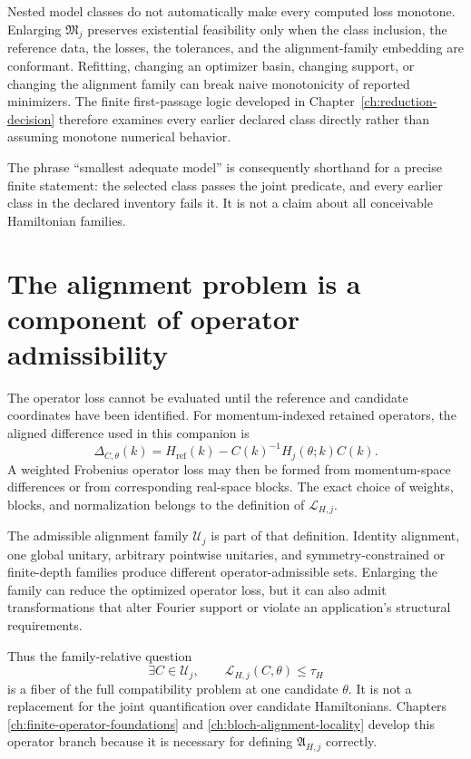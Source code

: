 Nested model classes do not automatically make every computed loss monotone.  Enlarging
$\mathfrak M_j$ preserves existential feasibility only when the class inclusion, the
reference data, the losses, the tolerances, and the alignment-family embedding are
conformant.  Refitting, changing an optimizer basin, changing support, or changing the
alignment family can break naive monotonicity of reported minimizers.  The finite
first-passage logic developed in Chapter~\ref{ch:reduction-decision} therefore examines
every earlier declared class directly rather than assuming monotone numerical behavior.

The phrase ``smallest adequate model'' is consequently shorthand for a precise finite
statement: the selected class passes the joint predicate, and every earlier class in the
declared inventory fails it.  It is not a claim about all conceivable Hamiltonian
families.

\section{The alignment problem is a component of operator admissibility}

The operator loss cannot be evaluated until the reference and candidate coordinates
have been identified.  For momentum-indexed retained operators, the aligned difference
used in this companion is
\[
  \Delta_{C,\theta}(k)
  =H_{\mathrm{ref}}(k)
   -C(k)^{-1}H_j(\theta;k)C(k).
\]
A weighted Frobenius operator loss may then be formed from momentum-space differences or
from corresponding real-space blocks.  The exact choice of weights, blocks, and
normalization belongs to the definition of $\mathcal L_{H,j}$.

The admissible alignment family $\mathcal U_j$ is part of that definition.  Identity
alignment, one global unitary, arbitrary pointwise unitaries, and symmetry-constrained
or finite-depth families produce different operator-admissible sets.  Enlarging the
family can reduce the optimized operator loss, but it can also admit transformations
that alter Fourier support or violate an application's structural requirements.

Thus the family-relative question
\[
  \exists C\in\mathcal U_j,
  \qquad
  \mathcal L_{H,j}(C,\theta)\leq\tau_H
\]
is a fiber of the full compatibility problem at one candidate $\theta$.  It is not a
replacement for the joint quantification over candidate Hamiltonians.  Chapters
\ref{ch:finite-operator-foundations} and \ref{ch:bloch-alignment-locality} develop this
operator branch because it is necessary for defining $\mathfrak A_{H,j}$ correctly.

